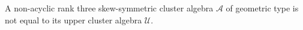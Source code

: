 \begin{Theorem}\label{main-cor}
A non-acyclic rank three skew-symmetric cluster algebra $\mathcal{A}$ of geometric type is not equal to its upper cluster algebra $\mathcal{U}$.
\end{Theorem}
